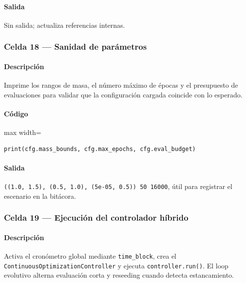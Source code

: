 \paragraph{Salida} Sin salida; actualiza referencias internas.

\subsubsection*{Celda 18 — Sanidad de parámetros}
\paragraph{Descripción} Imprime los rangos de masa, el número máximo de épocas y el presupuesto de evaluaciones para validar que la configuración cargada coincide con lo esperado.
\paragraph{Código}
\begin{listing}[H]
\caption{Celda 18: comprobación rápida de \texttt{Config}}
\label{lst:c04_cell18}
\begin{adjustbox}{max width=\textwidth}
\begin{minipage}{\textwidth}
\begin{verbatim}
print(cfg.mass_bounds, cfg.max_epochs, cfg.eval_budget)
\end{verbatim}
\end{minipage}
\end{adjustbox}
\end{listing}
\paragraph{Salida} \texttt{((1.0, 1.5), (0.5, 1.0), (5e-05, 0.5)) 50 16000}, útil para registrar el escenario en la bitácora.

\subsubsection*{Celda 19 — Ejecución del controlador híbrido}
\paragraph{Descripción} Activa el cronómetro global mediante \texttt{time\_block}, crea el \texttt{ContinuousOptimizationController} y ejecuta \texttt{controller.run()}. El loop evolutivo alterna evaluación corta y reseeding cuando detecta estancamiento.
